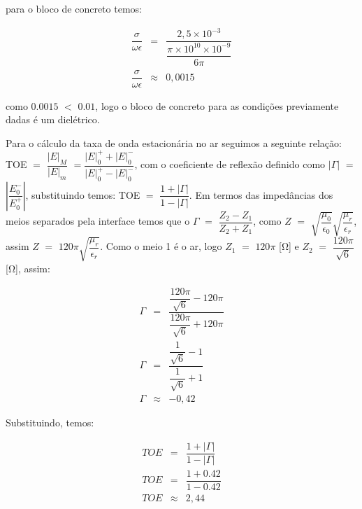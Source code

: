 \begin{enumerate}[1.]
para o bloco de concreto temos:

\begin{eqnarray*}
  \dfrac{\sigma}{\omega \epsilon} & = & \dfrac{2,5 \times 10^{-3}}{\dfrac{\pi \times 10^{10} \times 10^{-9}}{6\pi}} \nonumber \\
  \dfrac{\sigma}{\omega \epsilon} & \approx & 0,0015 \nonumber
\end{eqnarray*}

como $0.0015$ $<$ $0.01$, logo o bloco de concreto para as condições previamente dadas é um dielétrico.

Para o cálculo da taxa de onda estacionária no ar seguimos a seguinte relação: TOE $=$ $\dfrac{|E|_{M}}{|E|_{m}}$ $=$$\dfrac{|E|^{+}_{0} + |E|^{-}_{0}}{|E|^{+}_{0} - |E|^{-}_{0}}$, com o coeficiente de reflexão definido como $|\Gamma|$ $=$ $\left|\dfrac{E^{-}_{0}}{E^{+}_{0}}\right|$, substituindo temos: TOE $=$ $\dfrac{1 + |\Gamma|}{1 - |\Gamma|}$. Em termos das impedâncias dos meios separados pela interface temos que o $\Gamma$ $=$ $\dfrac{Z_{2} - Z_{1}}{Z_{2} + Z_{1}}$, como $Z$ $=$ $\sqrt{\dfrac{\mu_{0}}{\epsilon_{0}}}$$\sqrt{\dfrac{\mu_{r}}{\epsilon_{r}}}$, assim $Z$ $=$ $120\pi \sqrt{\dfrac{\mu_{r}}{\epsilon_{r}}}$.  Como o meio 1 é o ar, logo $Z_{1}$ $=$ $120\pi$ [\si{\ohm}] e $Z_{2}$ $=$ $\dfrac{120\pi}{\sqrt{6}}$ [\si{\ohm}], assim:

\begin{eqnarray*}
  \Gamma & = & \dfrac{\dfrac{120\pi}{\sqrt{6}} - 120\pi}{\dfrac{120\pi}{\sqrt{6}} + 120\pi} \nonumber \\
  \Gamma & = &\dfrac{\dfrac{1}{\sqrt{6}} - 1}{\dfrac{1}{\sqrt{6}} + 1} \nonumber \\
  \Gamma & \approx & -0,42 \nonumber
\end{eqnarray*}

Substituindo, temos:

\begin{eqnarray*}
  TOE & = & \dfrac{1 + |\Gamma|}{1 - |\Gamma|} \nonumber \\
  TOE & = & \dfrac{1 + 0.42}{1 - 0.42} \nonumber \\
  TOE & \approx & 2,44
\end{eqnarray*}

\end{enumerate}

